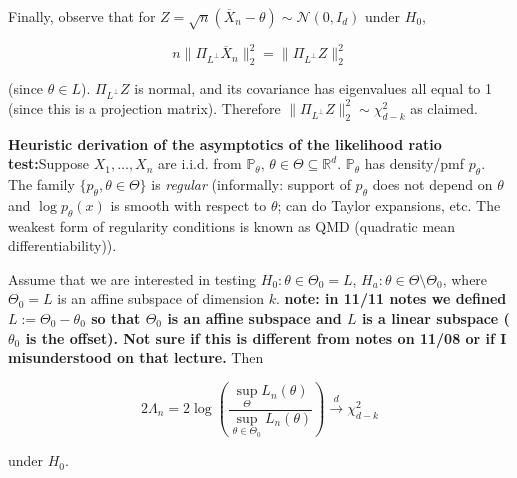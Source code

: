 \begin{example}
Finally, observe that for \(Z = \sqrt{n}(\overline{X}_n - \theta) \sim \mathcal{N}(0, I_d)\) under \(H_0\), 

\[
  n \lVert \Pi_{L^\perp} \overline{X}_n \rVert_2^2 =    \lVert \Pi_{L^\perp} Z \rVert_2^2
\]

(since \(\theta \in L\)). \(\Pi_{L^\perp}Z\) is normal, and its covariance has eigenvalues all equal to 1 (since this is a projection matrix). Therefore \( \lVert \Pi_{L^\perp} Z \rVert_2^2 \sim \chi_{d-k}^2\) as claimed. 

\end{example}

\textbf{Heuristic derivation of the asymptotics of the likelihood ratio test:}Suppose \(X_1, \ldots, X_n\) are i.i.d. from \(\mathbb{P}_\theta\), \(\theta \in \Theta \subseteq \mathbb{R}^d\). \(\mathbb{P}_\theta\) has density/pmf \(p_\theta\). The family \(\{p_\theta, \theta \in \Theta\}\) is \textit{regular} (informally: support of \(p_\theta\) does not depend on \(\theta\) and \(\log p_\theta(x)\) is smooth with respect to \(\theta\); can do Taylor expansions, etc. The weakest form of regularity conditions is known as QMD (quadratic mean differentiability)). 



\begin{theorem}\label{mathstats.wilks.thm}

Assume that we are interested in testing \(H_0: \theta \in \Theta_0 = L \), \(H_a: \theta \in \Theta \setminus \Theta_0\), where \(\Theta_0 = L\) is an affine subspace of dimension \(k\). \textbf{note: in 11/11 notes we defined \(L := \Theta_0 - \theta_0\) so that \(\Theta_0\) is an affine subspace and \(L\) is a linear subspace (\(\theta_0\) is the offset). Not sure if this is different from notes on 11/08 or if I misunderstood on that lecture.} Then

\[
2 \Lambda_n = 2  \log \left( \frac{\sup_{\Theta} L_n(\theta)}{\sup_{\theta \in \Theta_0} L_n (\theta)}  \right) \xrightarrow{d} \chi_{d-k}^2
\]

under \(H_0\).

\end{theorem}

